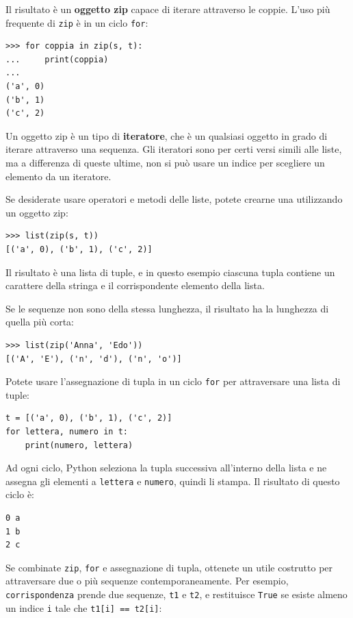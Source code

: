 \documentclass[10pt]{book}
\begin{document}
Il risultato è un {\bf oggetto zip} capace di iterare attraverso le coppie.  L'uso più frequente di {\tt zip} è in un ciclo {\tt for}:

\begin{verbatim}
>>> for coppia in zip(s, t):
...     print(coppia)
...
('a', 0)
('b', 1)
('c', 2)
\end{verbatim}
%
Un oggetto zip è un tipo di {\bf iteratore}, che è un qualsiasi oggetto in grado di iterare attraverso una sequenza. Gli iteratori sono per certi versi simili alle liste, ma a differenza di queste ultime, non si può usare un indice per scegliere un elemento da un iteratore.

Se desiderate usare operatori e metodi delle liste, potete crearne una utilizzando un oggetto zip:

\begin{verbatim}
>>> list(zip(s, t))
[('a', 0), ('b', 1), ('c', 2)]
\end{verbatim}
%
Il risultato è una lista di tuple, e in questo esempio ciascuna tupla contiene un carattere della stringa e il corrispondente elemento della lista.

Se le sequenze non sono della stessa lunghezza, il risultato ha la lunghezza di quella più corta:

\begin{verbatim}
>>> list(zip('Anna', 'Edo'))
[('A', 'E'), ('n', 'd'), ('n', 'o')]
\end{verbatim}
%
Potete usare l'assegnazione di tupla in un ciclo {\tt for} per attraversare una lista di tuple:

\begin{verbatim}
t = [('a', 0), ('b', 1), ('c', 2)]
for lettera, numero in t:
    print(numero, lettera)
\end{verbatim}
%
Ad ogni ciclo, Python seleziona la tupla successiva all'interno della lista e ne assegna gli elementi a {\tt lettera} e {\tt numero}, quindi li stampa.  Il risultato di questo ciclo è:

\begin{verbatim}
0 a
1 b
2 c
\end{verbatim}
%
Se combinate {\tt zip}, {\tt for} e assegnazione di tupla, ottenete un utile costrutto per attraversare due o più sequenze contemporaneamente. Per esempio, \verb"corrispondenza" prende due sequenze, {\tt t1} e
{\tt t2}, e restituisce {\tt True} se esiste almeno un indice {\tt i}
tale che {\tt t1[i] == t2[i]}:
\end{document}
